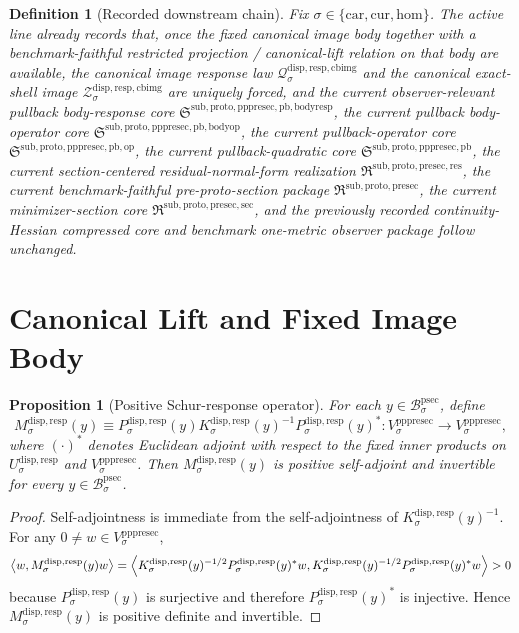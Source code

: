 \documentclass[11pt]{article}
\newcommand{\Car}{\mathrm{car}}
\newcommand{\Cur}{\mathrm{cur}}
\newcommand{\Hom}{\mathrm{hom}}
\newcommand{\ProtoSectionBody}[1]{\mathcal B_{#1}^{\mathrm{psec}}}
\newcommand{\PrePreProtoSectionPullbackCore}{\mathfrak S^{\mathrm{sub,proto,pppresec,pb}}}
\newcommand{\PrePreProtoSectionVertical}[1]{V_{#1}^{\mathrm{pppresec}}}
\newcommand{\PullbackOperatorCore}{\mathfrak S^{\mathrm{sub,proto,pppresec,pb,op}}}
\newcommand{\PullbackBodyOperatorCore}{\mathfrak S^{\mathrm{sub,proto,pppresec,pb,bodyop}}}
\newcommand{\PullbackBodyResponseCore}{\mathfrak S^{\mathrm{sub,proto,pppresec,pb,bodyresp}}}
\newcommand{\PreProtoSectionResidualPackage}{\mathfrak R^{\mathrm{sub,proto,presec,res}}}
\newcommand{\PreProtoSectionPackage}{\mathfrak R^{\mathrm{sub,proto,presec}}}
\newcommand{\PreProtoSectionMinSectionCore}{\mathfrak R^{\mathrm{sub,proto,presec,sec}}}
\newcommand{\SubstrateCarrier}[1]{U_{#1}^{\mathrm{disp,resp}}}
\newcommand{\SubstrateProjection}[1]{P_{#1}^{\mathrm{disp,resp}}}
\newcommand{\SubstrateOperator}[1]{K_{#1}^{\mathrm{disp,resp}}}
\newcommand{\SchurResponse}[1]{M_{#1}^{\mathrm{disp,resp}}}
\newcommand{\CanonicalImageShell}[1]{\mathcal Z_{#1}^{\mathrm{disp,resp,cbimg}}}
\newcommand{\CanonicalImageResponseLaw}[1]{\mathscr Q_{#1}^{\mathrm{disp,resp,cbimg}}}
\newtheorem{definition}{Definition}
\newtheorem{proposition}{Proposition}
\begin{document}
\begin{definition}[Recorded downstream chain]
\label{def:downstream}
Fix \(\sigma\in\{\Car,\Cur,\Hom\}\). The active line already records that, once the fixed canonical image body together with a benchmark-faithful restricted projection / canonical-lift relation on that body are available, the canonical image response law \(\CanonicalImageResponseLaw{\sigma}\) and the canonical exact-shell image \(\CanonicalImageShell{\sigma}\) are uniquely forced, and the current observer-relevant pullback body-response core \(\PullbackBodyResponseCore\), the current pullback body-operator core \(\PullbackBodyOperatorCore\), the current pullback-operator core \(\PullbackOperatorCore\), the current pullback-quadratic core \(\PrePreProtoSectionPullbackCore\), the current section-centered residual-normal-form realization \(\PreProtoSectionResidualPackage\), the current benchmark-faithful pre-proto-section package \(\PreProtoSectionPackage\), the current minimizer-section core \(\PreProtoSectionMinSectionCore\), and the previously recorded continuity-Hessian compressed core and benchmark one-metric observer package follow unchanged.
\end{definition}

\section{Canonical Lift and Fixed Image Body}

\begin{proposition}[Positive Schur-response operator]
\label{prop:schur}
For each \(y\in\ProtoSectionBody{\sigma}\), define
\[
\SchurResponse{\sigma}(y)
\equiv
\SubstrateProjection{\sigma}(y)
\SubstrateOperator{\sigma}(y)^{-1}
\SubstrateProjection{\sigma}(y)^*:
\PrePreProtoSectionVertical{\sigma}\to\PrePreProtoSectionVertical{\sigma},
\]
where \((\cdot)^*\) denotes Euclidean adjoint with respect to the fixed inner products on \(\SubstrateCarrier{\sigma}\) and \(\PrePreProtoSectionVertical{\sigma}\). Then \(\SchurResponse{\sigma}(y)\) is positive self-adjoint and invertible for every \(y\in\ProtoSectionBody{\sigma}\).
\end{proposition}

\begin{proof}
Self-adjointness is immediate from the self-adjointness of \(\SubstrateOperator{\sigma}(y)^{-1}\). For any \(0\neq w\in\PrePreProtoSectionVertical{\sigma}\),
\[
\ev{w,\SchurResponse{\sigma}(y)w}
=
\ev{
\SubstrateOperator{\sigma}(y)^{-1/2}\SubstrateProjection{\sigma}(y)^*w,
\SubstrateOperator{\sigma}(y)^{-1/2}\SubstrateProjection{\sigma}(y)^*w
}
>0
\]
because \(\SubstrateProjection{\sigma}(y)\) is surjective and therefore \(\SubstrateProjection{\sigma}(y)^*\) is injective. Hence \(\SchurResponse{\sigma}(y)\) is positive definite and invertible.
\end{proof}
\end{document}
